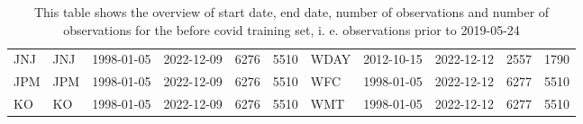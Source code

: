 \begin{table}[ht]
\begin{tabular}{llllrrlllrr}
  JNJ & JNJ & 1998-01-05 & 2022-12-09 & 6276 & 5510 & WDAY & 2012-10-15 & 2022-12-12 & 2557 & 1790 \\ 
  JPM & JPM & 1998-01-05 & 2022-12-09 & 6276 & 5510 & WFC & 1998-01-05 & 2022-12-12 & 6277 & 5510 \\ 
  KO & KO & 1998-01-05 & 2022-12-09 & 6276 & 5510 & WMT & 1998-01-05 & 2022-12-12 & 6277 & 5510 \\ 
   \hline
\end{tabular}
\caption[Overview]{This table shows the overview of start date, end date, number of observations and number of observations 
                     for the before covid training set, i. e. observations prior to 2019-05-24} 
\label{Table:Overview}
\end{table}
